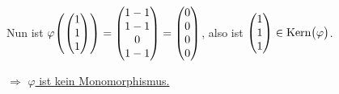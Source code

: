 \documentclass{scrreprt}
\newcommand\Kern{\text{Kern}}
\begin{document}
Nun ist $\varphi\qty(
  \begin{pmatrix} 1 \\ 1 \\ 1 \end{pmatrix}
) = \begin{pmatrix} 1 - 1 \\ 1 - 1 \\ 0 \\ 1 - 1 \end{pmatrix}
= \begin{pmatrix} 0 \\ 0 \\ 0 \\ 0 \end{pmatrix}$, also ist
$\begin{pmatrix} 1 \\ 1 \\ 1 \end{pmatrix} \in \Kern\qty\big(\varphi)$.

$\Rightarrow$ \underline{$\varphi$ ist kein Monomorphismus.}

\newpage
\end{document}
